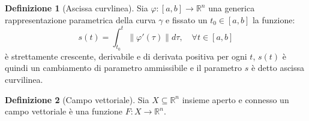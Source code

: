 \documentclass[leqno]{article}
\theoremstyle{definition}
\newtheorem{definition}{Definizione}[section]
\numberwithin{equation}{section}
\theoremstyle{remark}
\begin{document}
	\begin{definition}[Ascissa curvlinea]
		Sia $\varphi :[a,b]\to \mathbb{R}^n$ una generica rappresentazione parametrica della curva $\gamma$ e fissato un $t_0\in[a,b]$ la funzione: 
		\begin{equation}
			s(t)=\int_{t_0}^t\lVert \varphi'(\tau)\rVert d\tau, \quad \forall t \in [a,b]
		\end{equation}
		è strettamente crescente, derivabile e di derivata positiva per ogni $t$, $s(t)$ è quindi un cambiamento di parametro ammissibile e il parametro $s$ è detto ascissa curvilinea. 
	\end{definition}
	
	\begin{definition}[Campo vettoriale]
		Sia $X \subseteq \mathbb{R}^n$ insieme aperto e connesso un campo vettoriale è una funzione $F:X \to \mathbb{R}^n$.
	\end{definition}
	
\end{document}
